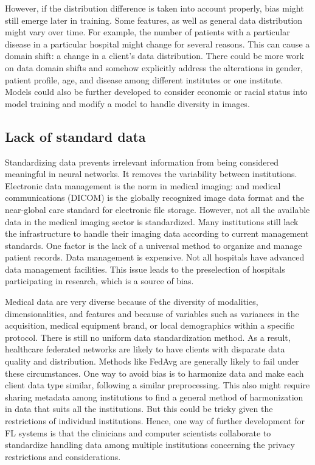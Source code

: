 However, if the distribution difference is taken into account properly, bias might still emerge later in training. Some features, as well as general data distribution might vary over time.  For example, the number of patients with a particular disease in a particular hospital might change for several reasons. This can cause a domain shift: a change in a client's data distribution. There could be more work on data domain shifts and somehow explicitly address the alterations in gender, patient profile, age, and disease among different institutes or one institute. Models could also be further developed to consider economic or racial status into model training and modify a model to handle diversity in images\cite{li2020multi}. 


\subsection{Lack of standard data}
Standardizing data prevents irrelevant information from being considered meaningful in neural networks. It removes the variability between institutions.  Electronic data management is the norm in medical imaging: and medical communications (DICOM) is the globally recognized image data format and the near-global care standard for electronic file storage. However, not all the available data in the medical imaging sector is standardized. Many institutions still lack the infrastructure to handle their imaging data according to current management standards. 
One factor is the lack of a universal method to organize and manage patient records. Data management is expensive\cite{wang2003cost}. Not all hospitals have advanced data management facilities. This issue leads to the preselection of hospitals participating in research, which is a source of bias.  



Medical data are very diverse because of the diversity of modalities, dimensionalities, and features and because of variables such as variances in the acquisition, medical equipment brand, or local demographics within a specific protocol. There is still no uniform data standardization method. As a result, healthcare federated networks are likely to have clients with disparate data quality and distribution. Methods like FedAvg are generally likely to fail under these circumstances.  One way to avoid bias is to harmonize data and make each client data type similar, following a similar preprocessing. This also might require sharing metadata among institutions to find a general method of harmonization in data that suits all the institutions. But this could be tricky given the restrictions of individual institutions. Hence, one way of further development for FL systems is that the clinicians and computer scientists collaborate to standardize handling data among multiple institutions concerning the privacy restrictions and considerations.



